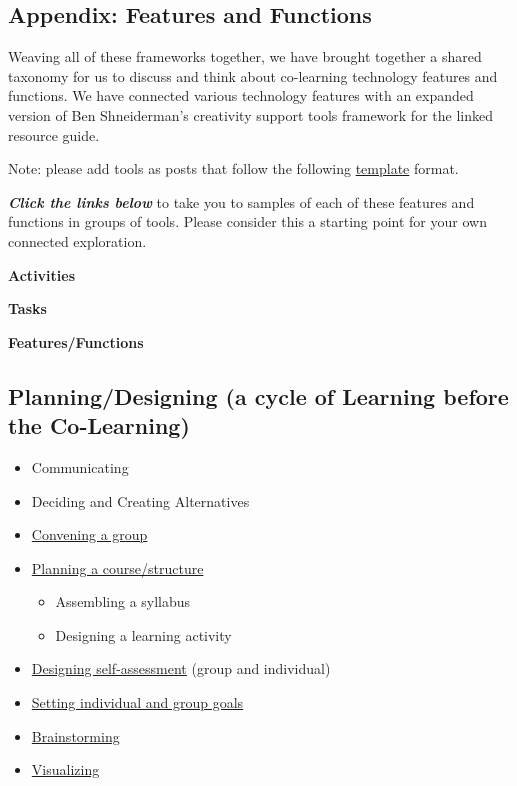 \subsection{Appendix: Features and Functions}

Weaving all of these frameworks together, we have brought together a
shared taxonomy for us to discuss and think about co-learning technology
features and functions. We have connected various technology features
with an expanded version of Ben Shneiderman's creativity support tools
framework for the linked resource guide.

Note: please add tools as posts that follow the following
\href{http://peeragogy.org/tool-post-template/\%20?}{template} format.

\emph{\textbf{Click the links below}} to take you to samples of each of
these features and functions in groups of tools. Please consider this a
starting point for your own connected exploration.

\textbf{Activities}

\textbf{Tasks}

\textbf{Features/Functions}

\subsection{Planning/Designing (a cycle of Learning before the
Co-Learning)}

\begin{itemize}
\item
  Communicating
\item
  Deciding and Creating Alternatives
\end{itemize}

\begin{itemize}
\item
  \href{http://peeragogy.org/convening-group/}{Convening a group}
\item
  \href{http://peeragogy.org/planning-a-coursestructure/}{Planning a
  course/structure}

  \begin{itemize}
  \item
    Assembling a syllabus
  \end{itemize}

  \begin{itemize}
  \item
    Designing a learning activity
  \end{itemize}
\item
  \href{http://peeragogy.org/designing-self-assessment/}{Designing
  self-assessment} (group and individual)
\item
  \href{http://peeragogy.org/setting-goals/}{Setting individual and
  group goals}
\item
  \href{http://peeragogy.org/brainstorming/}{Brainstorming}
\item
  \href{http://peeragogy.org/visualizing/}{Visualizing}
\end{itemize}

